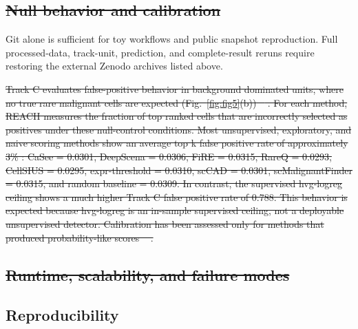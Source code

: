 \documentclass[10pt]{article}
\providecommand{\DIFaddtex}[1]{{\protect\color{trackgreen}#1}} %
\providecommand{\DIFdeltex}[1]{{\protect\color{red}\sout{#1}}}                      %
\providecommand{\DIFaddbegin}{} %
\providecommand{\DIFaddend}{} %
\providecommand{\DIFdelbegin}{} %
\providecommand{\DIFdelend}{} %
\providecommand{\DIFadd}[1]{\texorpdfstring{\DIFaddtex{#1}}{#1}} %
\providecommand{\DIFdel}[1]{\texorpdfstring{\DIFdeltex{#1}}{}} %
\newcommand{\DIFscaledelfig}{0.5}
\newlength{\DIFdelgraphicswidth} %
\newlength{\DIFdelgraphicsheight} %
\newcommand{\DIFaddincludegraphics}[2][]{{\color{trackgreen}\fbox{\DIFOincludegraphics[#1]{#2}}}} %
\newcommand{\DIFdelincludegraphics}[2][]{%
\sbox{\DIFdelgraphicsbox}{\DIFOincludegraphics[#1]{#2}}%
\settoboxwidth{\DIFdelgraphicswidth}{\DIFdelgraphicsbox} %
\settoboxtotalheight{\DIFdelgraphicsheight}{\DIFdelgraphicsbox} %
\scalebox{\DIFscaledelfig}{%
\parbox[b]{\DIFdelgraphicswidth}{\usebox{\DIFdelgraphicsbox}\\[-\baselineskip] \rule{\DIFdelgraphicswidth}{0em}}\llap{\resizebox{\DIFdelgraphicswidth}{\DIFdelgraphicsheight}{%
\setlength{\unitlength}{\DIFdelgraphicswidth}%
\begin{picture}(1,1)%
\thicklines\linethickness{2pt} %
{\color[rgb]{1,0,0}\put(0,0){\framebox(1,1){}}}%
{\color[rgb]{1,0,0}\put(0,0){\line( 1,1){1}}}%
{\color[rgb]{1,0,0}\put(0,1){\line(1,-1){1}}}%
\end{picture}%
}\hspace*{3pt}}} %
} %
\DeclareRobustCommand{\DIFaddbegin}{\DIFOaddbegin \let\includegraphics\DIFaddincludegraphics} %
\DeclareRobustCommand{\DIFaddend}{\DIFOaddend \let\includegraphics\DIFOincludegraphics} %
\DeclareRobustCommand{\DIFdelbegin}{\DIFOdelbegin \let\includegraphics\DIFdelincludegraphics} %
\DeclareRobustCommand{\DIFdelend}{\DIFOaddend \let\includegraphics\DIFOincludegraphics} %
\begin{document}
\DIFdelbegin \subsection{\DIFdel{Null behavior and calibration}}
\addtocounter{subsection}{-1}%
\DIFdelend \DIFaddbegin \DIFadd{Git alone is sufficient for toy workflows and public snapshot
reproduction. Full processed-data, track-unit, prediction, and
complete-result reruns require restoring the external Zenodo archives
listed above.
}\DIFaddend 

\DIFdelbegin \DIFdel{Track C evaluates false-positive behavior in background dominated units, where no true rare malignant cells are expected (Fig.~\ref{fig:fig5}(b)) \mbox{%
\cite{torre2018rare}}\hskip0pt%
. For each method, REACH measures the fraction of top
  ranked cells that are incorrectly selected as positives under these null-control conditions.
Most unsupervised, exploratory, and naive scoring methods show an average top k false positive rate of approximately 3\% : CaSee = 0.0301, DeepScena = 0.0306, FiRE = 0.0315, RareQ = 0.0293,
  CellSIUS = 0.0295, expr-threshold = 0.0310, scCAD = 0.0301, scMalignantFinder = 0.0315, and random baseline = 0.0309. In contrast, the supervised hvg-logreg ceiling shows a much higher Track C false positive rate of 0.788. This behavior is expected because hvg-logreg is an in-sample supervised ceiling, not a deployable unsupervised detector. Calibration has been assessed only for methods that produced probability-like scores \mbox{%
\cite{christensen2023evaluation,abdelaal2019comparison}}\hskip0pt%
. }\DIFdelend \DIFaddbegin \begin{center}\DIFadd{\rule{0.5\linewidth}{0.5pt}}\end{center}
\DIFaddend 

\DIFdelbegin \subsection{\DIFdel{Runtime, scalability, and failure modes}}
\addtocounter{subsection}{-1}%
\DIFdelend \DIFaddbegin \subsection{\DIFadd{Reproducibility}}\label{reproducibility}
\DIFaddend 
\end{document}
